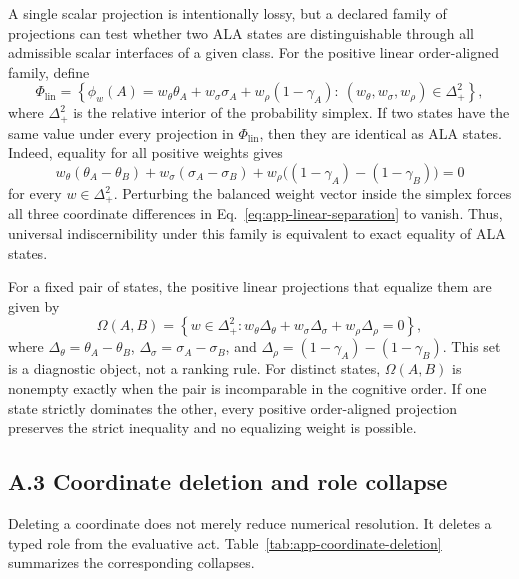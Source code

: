 \documentclass[reqno,final]{amsart}
\theoremstyle{definition}
\theoremstyle{plain}
\theoremstyle{remark}
\begin{document}
A single scalar projection is intentionally lossy, but a declared family of projections can test whether two ALA states are distinguishable through all admissible scalar interfaces of a given class. For the positive linear order-aligned family, define
\begin{equation}
\label{eq:app-positive-linear-family}
\Phi_{\mathrm{lin}}
=
\left\{
\phi_w(A)=w_\theta\theta_A+w_\sigma\sigma_A+w_\rho(1-\gamma_A)
:\
(w_\theta,w_\sigma,w_\rho)\in\Delta^2_{+}
\right\},
\end{equation}
where \(\Delta^2_{+}\) is the relative interior of the probability simplex. If two states have the same value under every projection in \(\Phi_{\mathrm{lin}}\), then they are identical as ALA states. Indeed, equality for all positive weights gives
\begin{equation}
\label{eq:app-linear-separation}
 w_\theta(\theta_A-\theta_B)
+w_\sigma(\sigma_A-\sigma_B)
+w_\rho\bigl((1-\gamma_A)-(1-\gamma_B)\bigr)=0
\end{equation}
for every \(w\in\Delta^2_{+}\). Perturbing the balanced weight vector inside the simplex forces all three coordinate differences in Eq.~\eqref{eq:app-linear-separation} to vanish. Thus, universal indiscernibility under this family is equivalent to exact equality of ALA states.

For a fixed pair of states, the positive linear projections that equalize them are given by
\begin{equation}
\label{eq:app-equalizing-set}
\Omega(A,B)=
\left\{
 w\in\Delta^2_{+}:
 w_\theta\Delta_\theta+w_\sigma\Delta_\sigma+w_\rho\Delta_\rho=0
\right\},
\end{equation}
where \(\Delta_\theta=\theta_A-\theta_B\), \(\Delta_\sigma=\sigma_A-\sigma_B\), and \(\Delta_\rho=(1-\gamma_A)-(1-\gamma_B)\). This set is a diagnostic object, not a ranking rule. For distinct states, \(\Omega(A,B)\) is nonempty exactly when the pair is incomparable in the cognitive order. If one state strictly dominates the other, every positive order-aligned projection preserves the strict inequality and no equalizing weight is possible.

\subsection*{A.3 Coordinate deletion and role collapse}

Deleting a coordinate does not merely reduce numerical resolution. It deletes a typed role from the evaluative act. Table~\ref{tab:app-coordinate-deletion} summarizes the corresponding collapses.
\end{document}
